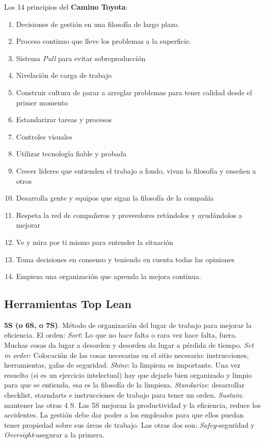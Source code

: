 \documentclass[]{article}
\begin{document}
Los 14 principios del \textbf{Camino Toyota}: \begin{enumerate} \item Decisiones de gestión en una filosofía de largo plazo. \item Proceso continuo que lleve los problemas a la superficie. \item Sistema \textit{Pull} para evitar sobreproducción \item Nivelación de carga de trabajo \item Construir cultura de parar a arreglar problemas para tener calidad desde el primer momento \item Estandarizar tareas y procesos \item Controles visuales \item Utilizar tecnología fiable y probada \item Crecer líderes que entienden el trabajo a fondo, vivan la filosofía y enseñen a otros \item Desarrolla gente y equipos que sigan la filosofía de la compañía \item Respeta la red de compañeros y proveedores retándolos y ayudándolos a mejorar \item Ve y mira por ti mismo para entender la situación \item Toma decisiones en consenso y teniendo en cuenta todas las opiniones \item Empieza una organización que aprenda la mejora continua. \end{enumerate}

\subsection{Herramientas Top Lean}

\textbf{5S (o 6S, o 7S)}. Método de organización del lugar de trabajo para mejorar la eficiencia. El orden: \textit{Sort}: Lo que no hace falta o rara vez hace falta, fuera. Muchas cosas da lugar a desorden y desorden da lugar a pérdida de tiempo. \textit{Set in order}: Colocación de las cosas necesarias en el sitio necesario: instrucciones, herramientas, gafas de seguridad. \textit{Shine}: la limpieza es importante. Una vez resuelto (si es un ejercicio intelectual) hay que dejarlo bien organizado y limpio para que se entienda, esa es la filosofía de la limpieza. \textit{Standarize}: desarrollar checklist, starndarts e instrucciones de trabajo para tener un orden. \textit{Sustain}: mantener las otras 4 S. Las 5S mejoran la productividad y la eficiencia, reduce los accidentes. La gestión debe dar poder a los empleados para que ellos puedan tener propiedad sobre sus áreas de trabajo. Las otras dos son: \textit{Safey}-seguridad y \textit{Oversight}-asegurar a la primera.
\end{document}
